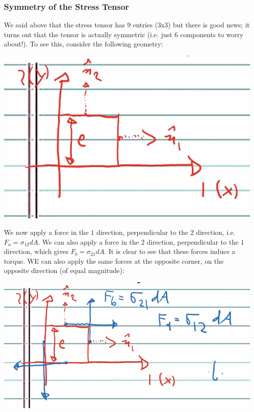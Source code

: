 \subsubsection{Symmetry of the Stress Tensor}
We said above that the stress tensor has 9 entries (3x3) but there is good news; it turns out that the tensor is actually symmetric (i.e. just 6 components to worry about!). To see this, consider the following geometry:
\begin{center}
    \includegraphics[scale=0.8]{Lecture-31/l31-img1.png}
\end{center}
We now apply a force in the $1$ direction, perpendicular to the $2$ direction, i.e. $F_{a} = \sigma_{12}dA$. We can also apply a force in the $2$ direction, perpendicular to the $1$ direction, which gives $F_b = \sigma_{21}dA$. It is clear to see that these forces induce a torque. WE can also apply the same forces at the opposite corner, on the opposite direction (of equal magnitude):
\begin{center}
    \includegraphics[scale=0.8]{Lecture-31/l31-img2.png}
\end{center}
